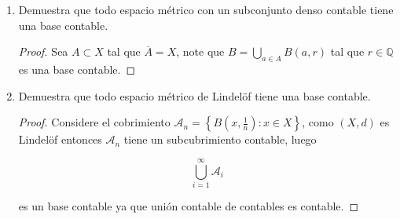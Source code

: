 
   \item 
    \begin{enumerate}
        \item Demuestra que todo espacio métrico con un subconjunto denso contable tiene una base contable.

        \begin{proof}
           Sea $A\subset X$ tal que $\overline{A}=X$, note que $B=\displaystyle\bigcup_{a\in A}B(a,r)$ tal que $r\in \mathbb{Q}$ es una base contable.
        \end{proof}

        \item Demuestra que todo espacio métrico de Lindelöf tiene una base contable.

        \begin{proof}
           Considere el cobrimiento $\mathcal{A}_n=\left\{B\left(x,\frac{1}{n}\right):x\in X\right\}$, como $(X,d)$ es Lindelöf entonces $\mathcal{A}_n$ tiene un subcubrimiento contable, luego

           $$\bigcup_{i=1}^{\infty}\mathcal{A}_i$$

           es un base contable ya que unión contable de contables es contable.
        \end{proof}
    \end{enumerate}

   